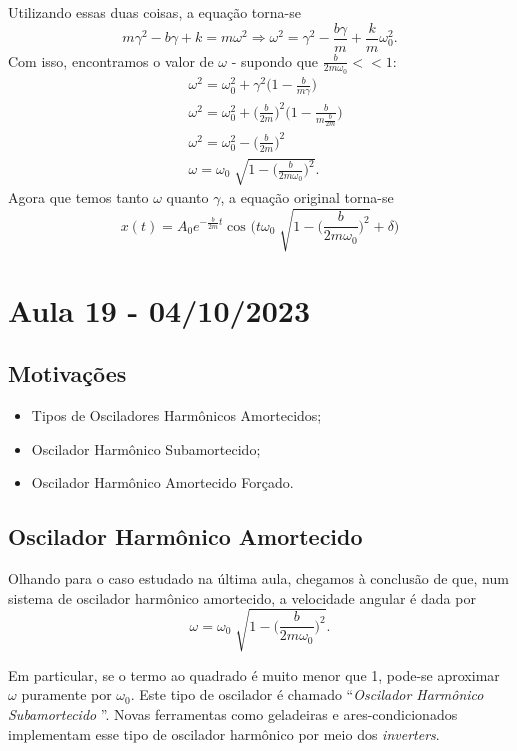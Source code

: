 \documentclass{article}
\begin{document}
Utilizando essas duas coisas, a equação torna-se 
  \[
    m\gamma ^{2} - b\gamma + k = m\omega ^{2} \Rightarrow \omega ^{2} = \gamma ^{2}-\frac{b\gamma }{m}+\frac{k}{m}\omega_{0}^{2}.
  \]
Com isso, encontramos o valor de \(\omega\) - supondo que \(\frac{b}{2m\omega_{0}} <<1\):
\begin{align*}
  &\omega ^{2} = \omega_{0}^{2} + \gamma ^{2}\biggl(1 - \frac{b}{m\gamma }\biggr)\\
  &\omega ^{2} = \omega_{0}^{2} + \biggl(\frac{b}{2m}\biggr)^{2}\biggl(1-\frac{b}{m \frac{b}{2m}}\biggr)\\
  &\omega ^{2} = \omega_{0}^{2} - \biggl(\frac{b}{2m}\biggr)^{2}\\
  &\omega  = \omega_{0}\sqrt[]{1-\biggl(\frac{b}{2m\omega_{0}}\biggr)^{2}}.
\end{align*}
  Agora que temos tanto \(\omega \) quanto \(\gamma \), a equação original torna-se 
    \[
      \boxed{x(t) = A_{0}e^{-\frac{b}{2m}t}\cos^{}{\biggl(t\omega_{0}\sqrt[]{1-\biggl(\frac{b}{2m\omega_{0}}\biggr)^{2}}+\delta \biggr)}}
    \]
\newpage

\section{Aula 19 - 04/10/2023}
\subsection{Motivações}
\begin{itemize}
  \item Tipos de Osciladores Harmônicos Amortecidos;
  \item Oscilador Harmônico Subamortecido;
  \item Oscilador Harmônico Amortecido Forçado.
\end{itemize}
\subsection{Oscilador Harmônico Amortecido}
  Olhando para o caso estudado na última aula, chegamos à conclusão de que, num sistema 
de oscilador harmônico amortecido, a velocidade angular é dada por 
  \[
    \omega  = \omega_{0} \sqrt[]{1-\biggl(\frac{b}{2m\omega_{0}}\biggr)^{2}}.
  \]

  Em particular, se o termo ao quadrado é muito menor que 1, pode-se aproximar \(\omega \) puramente
por \(\omega_{0}\). Este tipo de oscilador é chamado ``\textit{Oscilador Harmônico Subamortecido} ''. 
Novas ferramentas como geladeiras e ares-condicionados implementam esse tipo de oscilador harmônico por meio 
dos \textit{inverters}.
\end{document}
